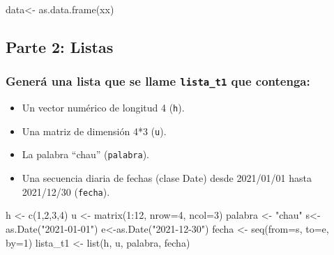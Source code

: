 \documentclass[
]{article}
\newenvironment{Shaded}{\begin{snugshade}}{\end{snugshade}}
\newcommand{\AttributeTok}[1]{\textcolor[rgb]{0.77,0.63,0.00}{#1}}
\newcommand{\DecValTok}[1]{\textcolor[rgb]{0.00,0.00,0.81}{#1}}
\newcommand{\FunctionTok}[1]{\textcolor[rgb]{0.00,0.00,0.00}{#1}}
\newcommand{\NormalTok}[1]{#1}
\newcommand{\OtherTok}[1]{\textcolor[rgb]{0.56,0.35,0.01}{#1}}
\newcommand{\SpecialCharTok}[1]{\textcolor[rgb]{0.00,0.00,0.00}{#1}}
\newcommand{\StringTok}[1]{\textcolor[rgb]{0.31,0.60,0.02}{#1}}
\providecommand{\tightlist}{%
  \setlength{\itemsep}{0pt}\setlength{\parskip}{0pt}}
\begin{document}
\begin{Shaded}
\begin{Highlighting}[]
\NormalTok{data}\OtherTok{\textless{}{-}} \FunctionTok{as.data.frame}\NormalTok{(xx)}
\end{Highlighting}
\end{Shaded}

\hypertarget{parte-2-listas}{%
\subsection{Parte 2: Listas}\label{parte-2-listas}}

\hypertarget{generuxe1-una-lista-que-se-llame-lista_t1-que-contenga}{%
\subsubsection{\texorpdfstring{Generá una lista que se llame
\texttt{lista\_t1} que
contenga:}{Generá una lista que se llame lista\_t1 que contenga:}}\label{generuxe1-una-lista-que-se-llame-lista_t1-que-contenga}}

\begin{itemize}
\tightlist
\item
  Un vector numérico de longitud 4 (\texttt{h}).
\item
  Una matriz de dimensión 4*3 (\texttt{u}).
\item
  La palabra ``chau'' (\texttt{palabra}).
\item
  Una secuencia diaria de fechas (clase Date) desde 2021/01/01 hasta
  2021/12/30 (\texttt{fecha}).
\end{itemize}

\begin{Shaded}
\begin{Highlighting}[]
\NormalTok{h }\OtherTok{\textless{}{-}} \FunctionTok{c}\NormalTok{(}\DecValTok{1}\NormalTok{,}\DecValTok{2}\NormalTok{,}\DecValTok{3}\NormalTok{,}\DecValTok{4}\NormalTok{)}
\NormalTok{u }\OtherTok{\textless{}{-}} \FunctionTok{matrix}\NormalTok{(}\DecValTok{1}\SpecialCharTok{:}\DecValTok{12}\NormalTok{, }\AttributeTok{nrow=}\DecValTok{4}\NormalTok{, }\AttributeTok{ncol=}\DecValTok{3}\NormalTok{)}
\NormalTok{palabra }\OtherTok{\textless{}{-}} \StringTok{"chau"}
\NormalTok{s}\OtherTok{\textless{}{-}}\FunctionTok{as.Date}\NormalTok{(}\StringTok{"2021{-}01{-}01"}\NormalTok{)}
\NormalTok{e}\OtherTok{\textless{}{-}}\FunctionTok{as.Date}\NormalTok{(}\StringTok{"2021{-}12{-}30"}\NormalTok{)}
\NormalTok{fecha }\OtherTok{\textless{}{-}} \FunctionTok{seq}\NormalTok{(}\AttributeTok{from=}\NormalTok{s, }\AttributeTok{to=}\NormalTok{e, }\AttributeTok{by=}\DecValTok{1}\NormalTok{)}
\NormalTok{lista\_t1 }\OtherTok{\textless{}{-}} \FunctionTok{list}\NormalTok{(h, u, palabra, fecha)}
\end{Highlighting}
\end{Shaded}
\end{document}
